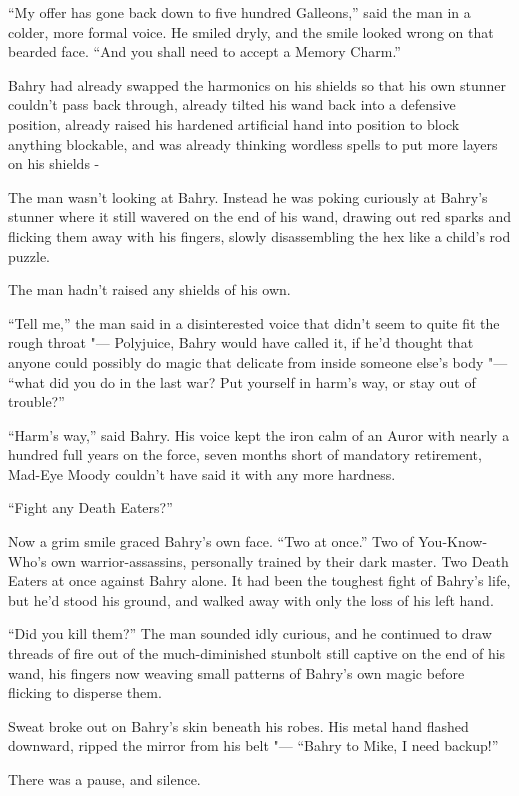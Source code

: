 ``My offer has gone back down to five hundred Galleons,'' said the man
in a colder, more formal voice. He smiled dryly, and the smile looked
wrong on that bearded face. ``And you shall need to accept a Memory
Charm.''

Bahry had already swapped the harmonics on his shields so that his own
stunner couldn't pass back through, already tilted his wand back into a
defensive position, already raised his hardened artificial hand into
position to block anything blockable, and was already thinking wordless
spells to put more layers on his shields -

The man wasn't looking at Bahry. Instead he was poking curiously at
Bahry's stunner where it still wavered on the end of his wand, drawing
out red sparks and flicking them away with his fingers, slowly
disassembling the hex like a child's rod puzzle.

The man hadn't raised any shields of his own.

``Tell me,'' the man said in a disinterested voice that didn't seem to
quite fit the rough throat "--- Polyjuice, Bahry would have called it, if
he'd thought that anyone could possibly do magic that delicate from
inside someone else's body "--- ``what did you do in the last war? Put
yourself in harm's way, or stay out of trouble?''

``Harm's way,'' said Bahry. His voice kept the iron calm of an Auror
with nearly a hundred full years on the force, seven months short of
mandatory retirement, Mad-Eye Moody couldn't have said it with any more
hardness.

``Fight any Death Eaters?''

Now a grim smile graced Bahry's own face. ``Two at once.'' Two of
You-Know-Who's own warrior-assassins, personally trained by their dark
master. Two Death Eaters at once against Bahry alone. It had been the
toughest fight of Bahry's life, but he'd stood his ground, and walked
away with only the loss of his left hand.

``Did you kill them?'' The man sounded idly curious, and he continued to
draw threads of fire out of the much-diminished stunbolt still captive
on the end of his wand, his fingers now weaving small patterns of
Bahry's own magic before flicking to disperse them.

Sweat broke out on Bahry's skin beneath his robes. His metal hand
flashed downward, ripped the mirror from his belt "--- ``Bahry to Mike, I
need backup!''

There was a pause, and silence.

